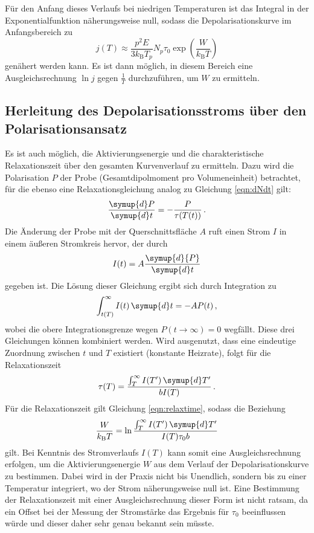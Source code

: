 Für den Anfang dieses Verlaufs bei niedrigen Temperaturen ist das Integral in der Exponentialfunktion näherungsweise null, sodass die Depolarisationskurve im Anfangsbereich zu
\begin{equation}
  j(T) \approx \frac{p^2 E}{3 k_\text{B} T_p} {N_p}{\tau_0}
               \exp\left(\frac{W}{k_{\text{B}}T}\right)
               \label{eqn:naeherung}
\end{equation}
genähert werden kann. Es ist dann möglich, in diesem Bereich eine Ausgleichsrechnung $\ln j$ gegen $\frac{1}{T}$ durchzuführen, um $W$ zu ermitteln.

\subsection{Herleitung des Depolarisationsstroms über den Polarisationsansatz}
\label{subsec:polAnsatz}

Es ist auch möglich, die Aktivierungsenergie und die charakteristische Relaxationszeit über den gesamten Kurvenverlauf zu ermitteln.
Dazu wird die Polarisation $P$ der Probe (Gesamtdipolmoment pro Volumeneinheit) betrachtet, für die ebenso eine Relaxationsgleichung analog zu Gleichung \eqref{eqn:dNdt} gilt:
\begin{equation}
  \frac{\symup{d}P}{\symup{d}t} = - \frac{P}{\tau(T(t))}\,.
\end{equation}
Die Änderung der Probe mit der Querschnittsfläche $A$ ruft einen Strom $I$ in einem äußeren Stromkreis hervor, der durch
\begin{equation}
  I(t) = A \frac{\symup{d}{P}}{\symup{d}t}
\end{equation}
gegeben ist. Die Lösung dieser Gleichung ergibt sich durch Integration zu
\begin{equation}
  \int_{t(T)}^{\infty} I(t) \, \symup{d}t = - A P(t)\,,
\end{equation}
wobei die obere Integrationsgrenze wegen $P(t\to\infty)=0$ wegfällt.
Diese drei Gleichungen können kombiniert werden. Wird ausgenutzt, dass eine eindeutige Zuordnung zwischen $t$ und $T$ existiert (konstante Heizrate), folgt für die Relaxationszeit
\begin{equation}
  \tau(T) = \frac{\int_T^{\infty} I(T') \, \symup{d}T'}{b I(T)}\,.
\end{equation}
Für die Relaxationszeit gilt Gleichung \eqref{eqn:relaxtime}, sodass die Beziehung
\begin{equation}
  \frac{W}{k_\text{B}T} = \ln \frac{\int_T^\infty I(T')\,\symup{d}T'}{I(T) \tau_0 b}
  \label{eqn:polAnsatz}
\end{equation}
gilt. Bei Kenntnis des Stromverlaufs $I(T)$ kann somit eine Ausgleichsrechnung erfolgen, um die Aktivierungsenergie $W$ aus dem Verlauf der Depolarisationskurve zu bestimmen. Dabei wird in der Praxis nicht bis Unendlich, sondern bis zu einer Temperatur integriert, wo der Strom näherungsweise null ist.
Eine Bestimmung der Relaxationszeit mit einer Ausgleichsrechnung dieser Form ist nicht ratsam, da ein Offset bei der Messung der Stromstärke das Ergebnis für $\tau_0$ beeinflussen würde und dieser daher sehr genau bekannt sein müsste.

